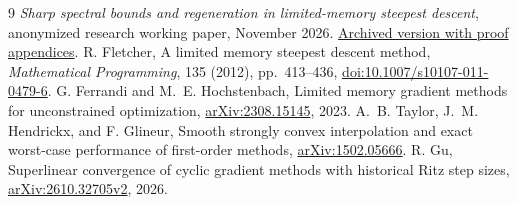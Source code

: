 \documentclass[11pt]{article}
\begin{document}
\begin{thebibliography}{9}
\emph{Sharp spectral bounds and regeneration in limited-memory steepest
descent}, anonymized research working paper, November 2026.
\href{https://taitai2025.github.io/assets/documents/research/lmsd-spectral.pdf}
{Archived version with proof appendices}.
R. Fletcher,
A limited memory steepest descent method,
\emph{Mathematical Programming}, 135 (2012), pp.\ 413--436,
\href{https://doi.org/10.1007/s10107-011-0479-6}{doi:10.1007/s10107-011-0479-6}.
G. Ferrandi and M.~E. Hochstenbach,
Limited memory gradient methods for unconstrained optimization,
\href{https://arxiv.org/abs/2308.15145}{arXiv:2308.15145}, 2023.
A.~B. Taylor, J.~M. Hendrickx, and F. Glineur,
Smooth strongly convex interpolation and exact worst-case performance
of first-order methods,
\href{https://arxiv.org/abs/1502.05666}{arXiv:1502.05666}.
R. Gu, Superlinear convergence of cyclic gradient methods with
historical Ritz step sizes,
\href{https://arxiv.org/abs/2610.32705v2}{arXiv:2610.32705v2}, 2026.
\end{thebibliography}
\end{document}
